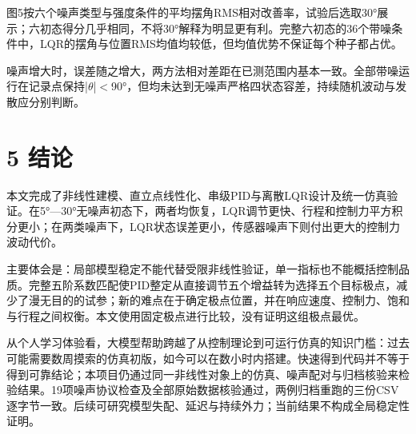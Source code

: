 \documentclass[UTF8,a4paper,fontset=fandol,zihao=5]{ctexart}
\begin{document}
图5按六个噪声类型与强度条件的平均摆角RMS相对改善率，试验后选取30°展示；六初态得分几乎相同，不将30°解释为明显更有利。完整六初态的36个带噪条件中，LQR的摆角与位置RMS均值均较低，但均值优势不保证每个种子都占优。\par
噪声增大时，误差随之增大，两方法相对差距在已测范围内基本一致。全部带噪运行在记录点保持|$\theta$|$<$90°，但均未达到无噪声严格四状态容差，持续随机波动与发散应分别判断。\par
\newpage
\section*{5 结论}
本文完成了非线性建模、直立点线性化、串级PID与离散LQR设计及统一仿真验证。在5°—30°无噪声初态下，两者均恢复，LQR调节更快、行程和控制力平方积分更小；在两类噪声下，LQR状态误差更小，传感器噪声下则付出更大的控制力波动代价。\par
主要体会是：局部模型稳定不能代替受限非线性验证，单一指标也不能概括控制品质。完整五阶系数匹配使PID整定从直接调节五个增益转为选择五个目标极点，减少了漫无目的的试参；新的难点在于确定极点位置，并在响应速度、控制力、饱和与行程之间权衡。本文使用固定极点进行比较，没有证明这组极点最优。\par
从个人学习体验看，大模型帮助跨越了从控制理论到可运行仿真的知识门槛：过去可能需要数周摸索的仿真初版，如今可以在数小时内搭建。快速得到代码并不等于得到可靠结论；本项目仍通过同一非线性对象上的仿真、噪声配对与归档核验来检验结果。19项噪声协议检查及全部原始数据核验通过，两例归档重跑的三份CSV逐字节一致。后续可研究模型失配、延迟与持续外力；当前结果不构成全局稳定性证明。\par
\end{document}
